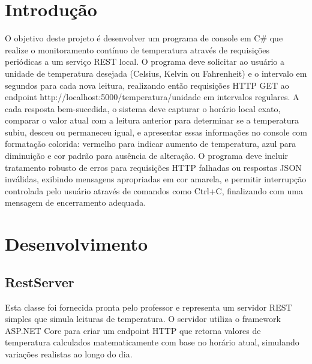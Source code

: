 \documentclass[
	12pt,				%
	oneside,			%
	a4paper,			%
	english,			%
	brazil,				%
	]{abntex2}
\begin{document}
\frenchspacing 

\imprimircapa

{
\ABNTEXchapterfont

\textual

\section{Introdução}

O objetivo deste projeto é desenvolver um programa de console em C# que realize o monitoramento contínuo de temperatura através de requisições periódicas a um serviço REST local. O programa deve solicitar ao usuário a unidade de temperatura desejada (Celsius, Kelvin ou Fahrenheit) e o intervalo em segundos para cada nova leitura, realizando então requisições HTTP GET ao endpoint http://localhost:5000/temperatura/{unidade} em intervalos regulares. A cada resposta bem-sucedida, o sistema deve capturar o horário local exato, comparar o valor atual com a leitura anterior para determinar se a temperatura subiu, desceu ou permaneceu igual, e apresentar essas informações no console com formatação colorida: vermelho para indicar aumento de temperatura, azul para diminuição e cor padrão para ausência de alteração. O programa deve incluir tratamento robusto de erros para requisições HTTP falhadas ou respostas JSON inválidas, exibindo mensagens apropriadas em cor amarela, e permitir interrupção controlada pelo usuário através de comandos como Ctrl+C, finalizando com uma mensagem de encerramento adequada.

\section{Desenvolvimento}

\subsection{RestServer}
Esta classe foi fornecida pronta pelo professor e representa um servidor REST simples que simula leituras de temperatura. O servidor utiliza o framework ASP.NET Core para criar um endpoint HTTP que retorna valores de temperatura calculados matematicamente com base no horário atual, simulando variações realistas ao longo do dia.

}
\end{document}

